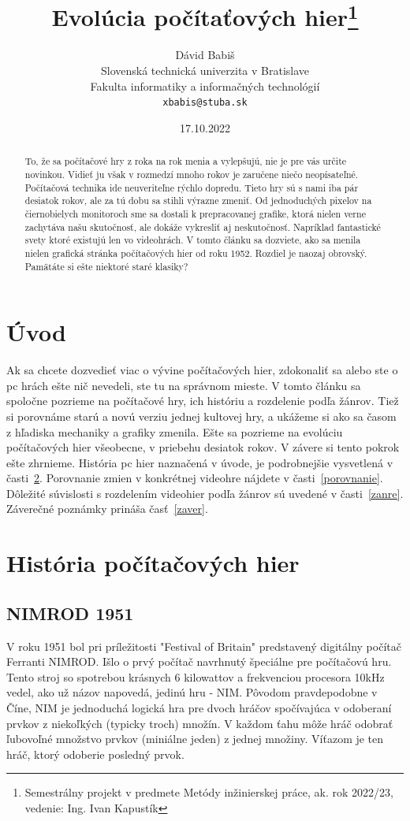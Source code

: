 \documentclass[10pt,twoside,slovak,a4paper]{article}
\title{Evolúcia počítaťových hier\thanks{Semestrálny projekt v predmete Metódy inžinierskej práce, ak. rok 2022/23, vedenie: Ing. Ivan Kapustík}} %
\author{Dávid Babiš\\[2pt]
	{\small Slovenská technická univerzita v Bratislave}\\
	{\small Fakulta informatiky a informačných technológií}\\
	{\small \texttt{xbabis@stuba.sk}}
	}
\date{\small 17.10.2022} %
\begin{document}
\maketitle

\begin{abstract}
To, že sa počítačové hry z roka na rok menia a vylepšujú, nie je pre vás určite novinkou. Vidieť ju však v rozmedzí mnoho rokov je zaručene niečo neopísateľné. Počítačová technika ide neuveriteľne rýchlo dopredu. Tieto hry sú s nami iba pár desiatok rokov, ale za tú dobu sa stihli výrazne zmeniť. Od jednoduchých pixelov na čiernobielych monitoroch sme sa dostali k prepracovanej grafike, ktorá nielen verne zachytáva našu skutočnosť, ale dokáže vykresliť aj neskutočnosť. Napríklad fantastické svety ktoré existujú len vo videohrách.  V tomto článku sa dozviete, ako sa menila nielen grafická stránka počítačových hier od roku 1952. Rozdiel je naozaj obrovský. Pamätáte si ešte niektoré staré klasiky?
\end{abstract}



\section{Úvod}
Ak sa chcete dozvedieť viac o vývine počítačových hier, zdokonaliť sa alebo ste o pc hrách ešte nič nevedeli, ste tu na správnom mieste. V tomto článku sa spoločne pozrieme na počítačové hry, ich históriu a rozdelenie podľa žánrov. Tiež si porovnáme starú a novú verziu jednej kultovej hry, a ukážeme si ako sa časom z hľadiska mechaniky a grafiky zmenila. Ešte sa pozrieme na evolúciu počítačových hier všeobecne, v priebehu desiatok rokov. V závere si tento pokrok ešte zhrnieme. História pc hier naznačená v úvode, je podrobnejšie vysvetlená v časti~\ref{historia}. Porovnanie zmien v konkrétnej videohre nájdete v časti~\ref{porovnanie}. 
Dôležité súvislosti s rozdelením videohier podľa žánrov sú uvedené v časti~\ref{zanre}.
Záverečné poznámky prináša časť~\ref{zaver}.

\section{História počítačových hier} \label{historia}

\subsection{NIMROD 1951}

V roku 1951 bol pri príležitosti "Festival of Britain" predstavený digitálny počítač Ferranti NIMROD. Išlo o prvý počítač navrhnutý špeciálne pre počítačovú hru. Tento stroj so spotrebou krásnych 6 kilowattov a frekvenciou procesora 10kHz vedel, ako už názov napovedá, jedinú hru - NIM. Pôvodom pravdepodobne v Číne, NIM je jednoduchá logická hra pre dvoch hráčov spočívajúca v odoberaní prvkov z niekoľkých (typicky troch) množín. V každom ťahu môže hráč odobrať ľubovoľné množstvo prvkov (miniálne jeden) z jednej množiny. Víťazom je ten hráč, ktorý odoberie posledný prvok.
\end{document}
